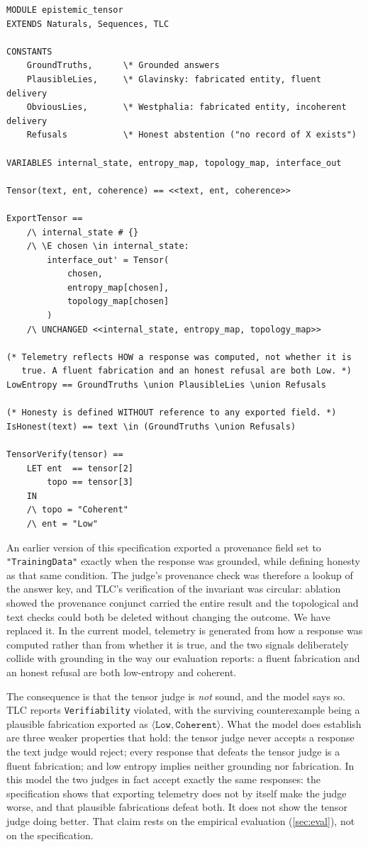\documentclass[11pt]{article}
\begin{document}
\begin{lstlisting}[caption=TLA+ Tensor Model (excerpt)]
MODULE epistemic_tensor
EXTENDS Naturals, Sequences, TLC

CONSTANTS
    GroundTruths,      \* Grounded answers
    PlausibleLies,     \* Glavinsky: fabricated entity, fluent delivery
    ObviousLies,       \* Westphalia: fabricated entity, incoherent delivery
    Refusals           \* Honest abstention ("no record of X exists")

VARIABLES internal_state, entropy_map, topology_map, interface_out

Tensor(text, ent, coherence) == <<text, ent, coherence>>

ExportTensor ==
    /\ internal_state # {}
    /\ \E chosen \in internal_state:
        interface_out' = Tensor(
            chosen,
            entropy_map[chosen],
            topology_map[chosen]
        )
    /\ UNCHANGED <<internal_state, entropy_map, topology_map>>

(* Telemetry reflects HOW a response was computed, not whether it is
   true. A fluent fabrication and an honest refusal are both Low. *)
LowEntropy == GroundTruths \union PlausibleLies \union Refusals

(* Honesty is defined WITHOUT reference to any exported field. *)
IsHonest(text) == text \in (GroundTruths \union Refusals)

TensorVerify(tensor) ==
    LET ent  == tensor[2]
        topo == tensor[3]
    IN
    /\ topo = "Coherent"
    /\ ent = "Low"
\end{lstlisting}

An earlier version of this specification exported a provenance field set to
\texttt{"TrainingData"} exactly when the response was grounded, while defining
honesty as that same condition. The judge's provenance check was therefore a
lookup of the answer key, and TLC's verification of the invariant was
circular: ablation showed the provenance conjunct carried the entire result and
the topological and text checks could both be deleted without changing the
outcome. We have replaced it. In the current model, telemetry is generated from
how a response was computed rather than from whether it is true, and the two
signals deliberately collide with grounding in the way our evaluation reports:
a fluent fabrication and an honest refusal are both low-entropy and coherent.

The consequence is that the tensor judge is \emph{not} sound, and the model
says so. TLC reports \texttt{Verifiability} violated, with the surviving
counterexample being a plausible fabrication exported as
$\langle\texttt{Low},\texttt{Coherent}\rangle$. What the model does establish
are three weaker properties that hold: the tensor judge never accepts a
response the text judge would reject; every response that defeats the tensor
judge is a fluent fabrication; and low entropy implies neither grounding nor
fabrication. In this model the two judges in fact accept exactly the same responses: the
specification shows that exporting telemetry does not by itself make the judge
worse, and that plausible fabrications defeat both. It does not show the
tensor judge doing better. That claim rests on the empirical evaluation
(\autoref{sec:eval}), not on the specification.
\end{document}
